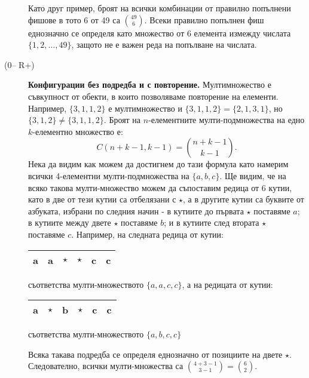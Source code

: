 \begin{description}
  Като друг пример, броят на всички комбинации от правилно попълнени фишове в тото 6 от 49 са $\binom{49}{6}$.
  Всеки правилно попълнен фиш еднозначно се определя като множество от 6 елемента измежду числата $\{1,2,\dots,49\}$,
  защото не е важен реда на попълване на числата.
\item[(0-- R+)]
  {\bf Конфигурации без подредба и с повторение.}
  Мултимножество е съвкупност от обекти, в които позволяваме повторение на елементи.
  Например, $\{3,1,1,2\}$ е мултимножество и $\{3,1,1,2\} = \{2,1,3,1\}$,
  но $\{3,1,2\} \neq \{3,1,1,2\}$.
  Броят на $n$-елементните мулти-подмножества на едно $k$-елементно множество е:
  \[C(n+k-1,k-1) = \binom{n+k-1}{k-1}.\]
  Нека да видим как можем да достигнем до тази формула като намерим всички 4-елементни мулти-подмножества
  на $\{a,b,c\}$. Ще видим, че на всяко такова мулти-множество можем да съпоставим редица от 6 кутии,
  като в две от тези кутии са отбелязани с $\star$, а в другите кутии са буквите от азбуката, избрани по следния начин - 
  в кутиите до първата $\star$ поставяме $a$; в кутиите между двете $\star$ поставяме $b$; и в кутиите след втората $\star$
  поставяме $c$.
  Например, на следната редица от кутии:
  
  \begin{tabular}{|l|l|l|l|l|l|}
    \hline
    a & a & $\star$ & $\star$ & c & c \\
    \hline
  \end{tabular}  
  съответства мулти-множеството $\{a,a,c,c\}$, а на редицата от кутии:

  \begin{tabular}{|l|l|l|l|l|l|}
    \hline
    a & $\star$ & b & $\star$ & c & c \\
    \hline
  \end{tabular}
  съответства мулти-множеството $\{a,b,c,c\}$
  
  Всяка такава подредба се определя еднозначно от позициите на двете $\star$.
  Следователно, всички мулти-множества са $\binom{4+3-1}{3-1} = \binom{6}{2}$.
\end{description}



